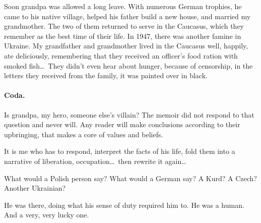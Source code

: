 Soon grandpa was allowed a long leave. With numerous German trophies,
he came to his native village, helped his father build a new house,
and married my grandmother. The two of them returned to serve in the
Caucasus, which they remember as the best time of their life. In 1947,
there was another famine in Ukraine. My grandfather and grandmother
lived in the Caucasus well, happily, ate deliciously, remembering that
they received an officer's food ration with smoked fish\ldots\ They
didn't even hear about hunger, because of censorship, in the letters
they received from the family, it was painted over in black.

\paragraph{Coda.}

Is grandpa, my hero, someone else's villain? The memoir did not
respond to that question and never will. Any reader will make
conclusions according to their upbringing, that makes a core of values
and beliefs.

It is me who has to respond, interpret the facts of his life, fold
them into a narrative of liberation, occupation\ldots\ then rewrite it
again\ldots

What would a Polish person say? What would a German say? A Kurd? A
Czech? Another Ukrainian?

He was there, doing what his sense of duty required him to. He was a
human. And a very, very lucky one.

% 
